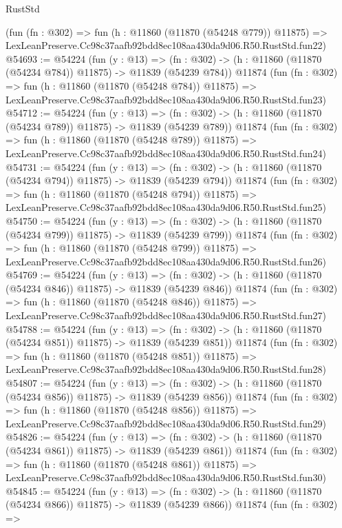 \begin{lexlean}{RustStd}
\begin{coremodule}
    (fun (fn : @302) =>
    fun (h : @11860 (@11870 (@54248 @779)) @11875) =>
    LexLeanPreserve.Cc98c37aafb92bdd8ec108aa430da9d06.R50.RustStd.fun22)
@54693 := @54224
    (fun (y : @13) =>
    (fn : @302) -> (h : @11860 (@11870 (@54234 @784)) @11875) -> @11839 (@54239 @784))
    @11874
    (fun (fn : @302) =>
    fun (h : @11860 (@11870 (@54248 @784)) @11875) =>
    LexLeanPreserve.Cc98c37aafb92bdd8ec108aa430da9d06.R50.RustStd.fun23)
@54712 := @54224
    (fun (y : @13) =>
    (fn : @302) -> (h : @11860 (@11870 (@54234 @789)) @11875) -> @11839 (@54239 @789))
    @11874
    (fun (fn : @302) =>
    fun (h : @11860 (@11870 (@54248 @789)) @11875) =>
    LexLeanPreserve.Cc98c37aafb92bdd8ec108aa430da9d06.R50.RustStd.fun24)
@54731 := @54224
    (fun (y : @13) =>
    (fn : @302) -> (h : @11860 (@11870 (@54234 @794)) @11875) -> @11839 (@54239 @794))
    @11874
    (fun (fn : @302) =>
    fun (h : @11860 (@11870 (@54248 @794)) @11875) =>
    LexLeanPreserve.Cc98c37aafb92bdd8ec108aa430da9d06.R50.RustStd.fun25)
@54750 := @54224
    (fun (y : @13) =>
    (fn : @302) -> (h : @11860 (@11870 (@54234 @799)) @11875) -> @11839 (@54239 @799))
    @11874
    (fun (fn : @302) =>
    fun (h : @11860 (@11870 (@54248 @799)) @11875) =>
    LexLeanPreserve.Cc98c37aafb92bdd8ec108aa430da9d06.R50.RustStd.fun26)
@54769 := @54224
    (fun (y : @13) =>
    (fn : @302) -> (h : @11860 (@11870 (@54234 @846)) @11875) -> @11839 (@54239 @846))
    @11874
    (fun (fn : @302) =>
    fun (h : @11860 (@11870 (@54248 @846)) @11875) =>
    LexLeanPreserve.Cc98c37aafb92bdd8ec108aa430da9d06.R50.RustStd.fun27)
@54788 := @54224
    (fun (y : @13) =>
    (fn : @302) -> (h : @11860 (@11870 (@54234 @851)) @11875) -> @11839 (@54239 @851))
    @11874
    (fun (fn : @302) =>
    fun (h : @11860 (@11870 (@54248 @851)) @11875) =>
    LexLeanPreserve.Cc98c37aafb92bdd8ec108aa430da9d06.R50.RustStd.fun28)
@54807 := @54224
    (fun (y : @13) =>
    (fn : @302) -> (h : @11860 (@11870 (@54234 @856)) @11875) -> @11839 (@54239 @856))
    @11874
    (fun (fn : @302) =>
    fun (h : @11860 (@11870 (@54248 @856)) @11875) =>
    LexLeanPreserve.Cc98c37aafb92bdd8ec108aa430da9d06.R50.RustStd.fun29)
@54826 := @54224
    (fun (y : @13) =>
    (fn : @302) -> (h : @11860 (@11870 (@54234 @861)) @11875) -> @11839 (@54239 @861))
    @11874
    (fun (fn : @302) =>
    fun (h : @11860 (@11870 (@54248 @861)) @11875) =>
    LexLeanPreserve.Cc98c37aafb92bdd8ec108aa430da9d06.R50.RustStd.fun30)
@54845 := @54224
    (fun (y : @13) =>
    (fn : @302) -> (h : @11860 (@11870 (@54234 @866)) @11875) -> @11839 (@54239 @866))
    @11874
    (fun (fn : @302) =>

\end{coremodule}
\end{lexlean}

